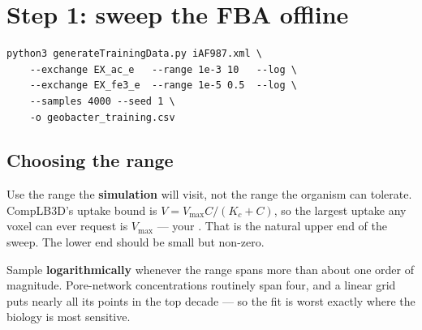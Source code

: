 \begin{center}
\end{center}

\section{Step 1: sweep the FBA offline}

\begin{lstlisting}[style=sh]
python3 generateTrainingData.py iAF987.xml \
    --exchange EX_ac_e   --range 1e-3 10   --log \
    --exchange EX_fe3_e  --range 1e-5 0.5  --log \
    --samples 4000 --seed 1 \
    -o geobacter_training.csv
\end{lstlisting}

\subsection{Choosing the range}

\begin{cbnote}
Use the range the \textbf{simulation} will visit, not the range the organism
can tolerate. CompLB3D's uptake bound is
$V = V_{\max} C/(K_c+C)$, so the largest uptake any voxel can ever request is
$V_{\max}$ --- your . That is the natural upper
end of the sweep. The lower end should be small but non-zero.
\end{cbnote}

Sample \textbf{logarithmically} whenever the range spans more than about one
order of magnitude. Pore-network concentrations routinely span four, and a
linear grid puts nearly all its points in the top decade --- so the fit is worst
exactly where the biology is most sensitive.

